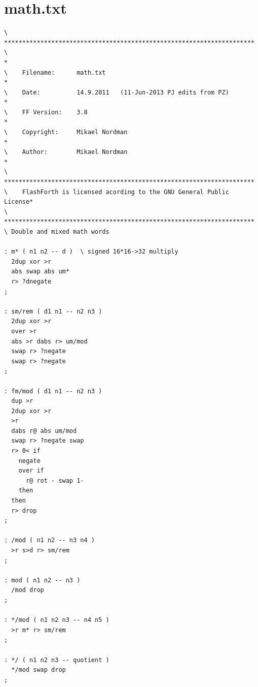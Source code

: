 \documentclass[12pt,a4paper]{article}
\begin{document}
\section{math.txt}
\label{sec:math}
%
{\scriptsize
\begin{verbatim}
\ *********************************************************************
\                                                                     *
\    Filename:      math.txt                                          *
\    Date:          14.9.2011   (11-Jun-2013 PJ edits from PZ)        *
\    FF Version:    3.8                                               *
\    Copyright:     Mikael Nordman                                    *
\    Author:        Mikael Nordman                                    *
\ *********************************************************************
\    FlashForth is licensed acording to the GNU General Public License*
\ *********************************************************************
\ Double and mixed math words

: m* ( n1 n2 -- d )  \ signed 16*16->32 multiply
  2dup xor >r
  abs swap abs um*
  r> ?dnegate
;

: sm/rem ( d1 n1 -- n2 n3 )
  2dup xor >r
  over >r
  abs >r dabs r> um/mod
  swap r> ?negate
  swap r> ?negate
;

: fm/mod ( d1 n1 -- n2 n3 )
  dup >r
  2dup xor >r
  >r
  dabs r@ abs um/mod
  swap r> ?negate swap
  r> 0< if
    negate
    over if
      r@ rot - swap 1-
    then
  then
  r> drop
;

: /mod ( n1 n2 -- n3 n4 )
  >r s>d r> sm/rem
;

: mod ( n1 n2 -- n3 )
  /mod drop
;

: */mod ( n1 n2 n3 -- n4 n5 )
  >r m* r> sm/rem
;

: */ ( n1 n2 n3 -- quotient )
  */mod swap drop
;


\end{verbatim}
}

\newpage
\end{document}
